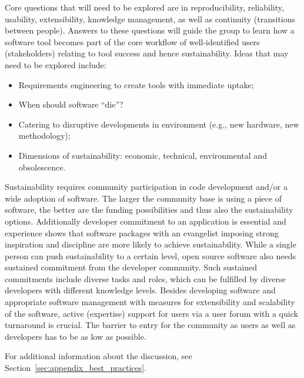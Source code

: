 Core questions that will need to be explored are in reproducibility, 
reliability,  usability, extensibility, knowledge management, as well as continuity
(transitions between people). Answers to these questions will guide the group
to learn how a software
tool becomes part of the core workflow of well-identified users (stakeholders)
relating to tool success and hence sustainability.
Ideas  that may need to be explored include:
\begin{itemize}
\item Requirements engineering to create tools with immediate uptake;
\item When should software ``die''?
\item Catering to disruptive developments in environment (e.g., new hardware,
new methodology);
\item Dimensions of sustainability: economic, technical, environmental and
obsolescence. 
\end{itemize}

Sustainability requires community participation in code development and/or a
wide adoption of software. The larger the community base is using a piece of
software, the better are the funding possibilities and thus also the
sustainability options. Additionally developer commitment to an application is
essential and experience shows that software packages with an evangelist
imposing strong inspiration and discipline are more likely to achieve
sustainability. While a single person can push sustainability to a certain
level, open source software also needs sustained commitment from the developer
community. Such sustained commitments include diverse tasks and roles, which can
be fulfilled by diverse developers with different knowledge levels. Besides
developing software and appropriate software management with measures for
extensibility and scalability of the software, active (expertise) support for
users via a user forum with a quick turnaround is crucial. The barrier to entry
for the community as users as well as developers has to be as low as possible.

For additional information about the discussion, see
Section~\ref{sec:appendix_best_practices}.

